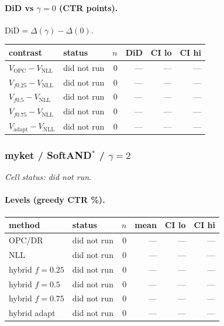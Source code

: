 \documentclass[10pt,a4paper]{article}
\begin{document}
\paragraph{DiD vs $\gamma=0$ (CTR points).} $\mathrm{DiD}=\Delta(\gamma)-\Delta(0)$.
{\centering\small\begin{tabular}{llrrrr}
\toprule contrast & status & $n$ & DiD & CI lo & CI hi \\
\midrule
$V_{\mathrm{OPC}}-V_{\mathrm{NLL}}$ & did not run & 0 & --- & --- & --- \\
$V_{f0.25}-V_{\mathrm{NLL}}$ & did not run & 0 & --- & --- & --- \\
$V_{f0.5}-V_{\mathrm{NLL}}$ & did not run & 0 & --- & --- & --- \\
$V_{f0.75}-V_{\mathrm{NLL}}$ & did not run & 0 & --- & --- & --- \\
$V_{\mathrm{adapt}}-V_{\mathrm{NLL}}$ & did not run & 0 & --- & --- & --- \\
\bottomrule\end{tabular}\par}
\bigskip
\subsubsection{myket / SoftAND$^*$ / $\gamma=2$}
\emph{Cell status: did not run}.
\paragraph{Levels (greedy CTR \%).}
{\centering\small\begin{tabular}{llrrrr}
\toprule method & status & $n$ & mean & CI lo & CI hi \\
\midrule
OPC/DR & did not run & 0 & --- & --- & --- \\
NLL & did not run & 0 & --- & --- & --- \\
hybrid $f{=}0.25$ & did not run & 0 & --- & --- & --- \\
hybrid $f{=}0.5$ & did not run & 0 & --- & --- & --- \\
hybrid $f{=}0.75$ & did not run & 0 & --- & --- & --- \\
hybrid adapt & did not run & 0 & --- & --- & --- \\
\bottomrule\end{tabular}\par}
\end{document}
